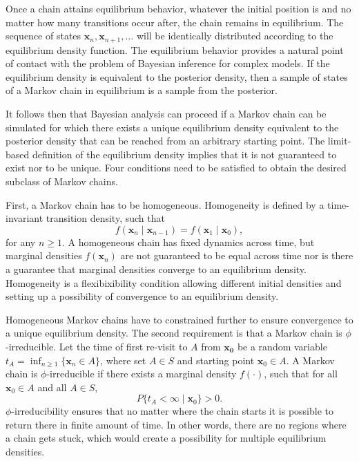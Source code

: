 \documentclass[12pt]{report}
\begin{document}
Once a chain attains equilibrium behavior, whatever the initial position is and no matter how many transitions occur after, the chain remains in equilibrium. The sequence of states $\boldsymbol{x}_n, \boldsymbol{x}_{n+1}, \ldots$ will be identically distributed according to the equilibrium density function. The equilibrium behavior provides a natural point of contact with the problem of Bayesian inference for complex models. If the equilibrium density is equivalent to the posterior density, then a sample of states of a Markov chain in equilibrium is a sample from the posterior. 

It follows then that Bayesian analysis can proceed if a Markov chain can be simulated for which there exists a unique equilibrium density equivalent to the posterior density that can be reached from an arbitrary starting point. The limit-based definition of the equilibrium density implies that it is not guaranteed to exist nor to be unique. Four conditions need to be satisfied to obtain the desired subclass of Markov chains. 

First, a Markov chain has to be homogeneous. Homogeneity is  defined by a time-invariant transition density, such that
\begin{equation}
f(\boldsymbol{x}_n \mid \boldsymbol{x}_{n-1}) = f(\boldsymbol{x}_1 \mid \boldsymbol{x}_0),
\end{equation}
for any $n \geq 1$. A homogeneous chain has fixed dynamics across time, but marginal densities $f(\boldsymbol{x}_n)$ are not guaranteed to be equal across time nor is there a guarantee that marginal densities converge to an equilibrium density. Homogeneity is a flexibixibility condition allowing different initial densities and setting up a possibility of convergence to an equilibrium density. 

Homogeneous Markov chains have to constrained further to ensure convergence to a unique equilibrium density. The second requirement is that a Markov chain is $\phi$-irreducible.  Let the time of first re-visit to $A$ from $\boldsymbol{x_0}$ be a random variable $t_A = \inf_{n \geq 1} \{\boldsymbol{x}_n \in A\}$, where set $A \in S$ and starting point $\boldsymbol{x}_0 \in A$. A Markov chain is $\phi$-irreducible if there exists a marginal density $f(\cdot)$, such that for all $\boldsymbol{x}_0 \in A$ and all $A \in S$, 
\begin{equation}
P\{t_A < \infty \mid \boldsymbol{x}_0\} > 0. 
\end{equation}
$\phi$-irreducibility ensures that no matter where the chain starts it is possible to return there in finite amount of time. In other words, there are no regions where a chain gets stuck, which would create a possibility for multiple equilibrium densities.
\end{document}
